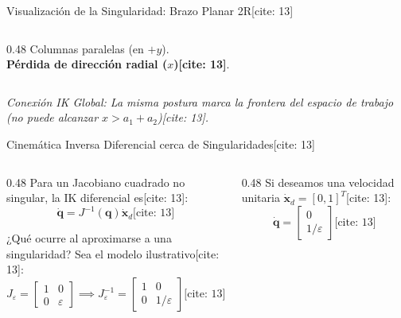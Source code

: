 \documentclass[aspectratio=169, xcolor={table,xcdraw}]{beamer}
\begin{document}
\begin{frame}{Visualización de la Singularidad: Brazo Planar 2R[cite: 13]}
\begin{columns}[T]
\begin{column}{0.48\textwidth}
            \footnotesize Columnas paralelas (en $+y$). \\
            \textbf{Pérdida de dirección radial ($x$)[cite: 13]}.
            
        \end{column}
    \end{columns}
    
    \vspace{0.2cm}
    \footnotesize \textit{Conexión IK Global: La misma postura marca la frontera del espacio de trabajo (no puede alcanzar $x > a_1+a_2$)[cite: 13].}
\end{frame}

\begin{frame}{Cinemática Inversa Diferencial cerca de Singularidades[cite: 13]}
    \begin{columns}[T]
        \begin{column}{0.48\textwidth}
            Para un Jacobiano cuadrado no singular, la IK diferencial es[cite: 13]:
            \begin{equation*}
                \boxed{\dot{\mathbf{q}} = J^{-1}(\mathbf{q})\dot{\mathbf{x}}_d} \text{[cite: 13]}
            \end{equation*}
            
            ¿Qué ocurre al aproximarse a una singularidad? Sea el modelo ilustrativo[cite: 13]:
            \begin{equation*}
                J_\varepsilon = \begin{bmatrix} 1 & 0 \\ 0 & \varepsilon \end{bmatrix} \implies J_\varepsilon^{-1} = \begin{bmatrix} 1 & 0 \\ 0 & 1/\varepsilon \end{bmatrix} \text{[cite: 13]}
            \end{equation*}
        \end{column}
        \begin{column}{0.48\textwidth}
            Si deseamos una velocidad unitaria $\dot{\mathbf{x}}_d = [0, 1]^T$[cite: 13]:
            \begin{equation*}
                \dot{\mathbf{q}} = \begin{bmatrix} 0 \\ 1/\varepsilon \end{bmatrix} \text{[cite: 13]}
            \end{equation*}
            

\end{column}
\end{columns}
\end{frame}
\end{document}
